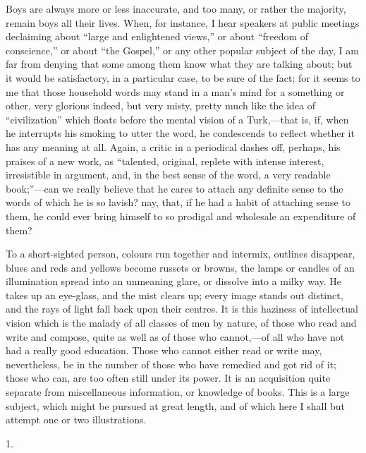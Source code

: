 Boys are always more or less inaccurate, and too many, or rather
the majority, remain boys all their lives. When, for instance, I hear
speakers at public meetings declaiming about ``large and
enlightened views,'' or about ``freedom of conscience,''
or about ``the Gospel,'' or any other popular subject of the
day, I am far from denying that some among them know what they are
talking about; but it would be satisfactory, in a particular case, to
be sure of the fact; for it seems to me that those household words may
stand in a man's mind for a something or other, very glorious indeed,
but very misty, pretty much like the idea of ``civilization''
which floats before the mental vision of a Turk,—that is, if,
when he interrupts his smoking to utter the word, he condescends to
reflect whether it has any meaning at all. Again, a critic in a
periodical dashes off, perhaps, his praises of a new work, as
``talented, original, replete with intense interest, irresistible
in argument, and, in the best sense of the word, a very readable
book;''—can we really believe that he cares to attach any
definite sense to the words of which he is so lavish? nay, that, if he
had a habit of attaching sense to them, he could ever bring himself to
so prodigal and wholesale an expenditure of them?

To a short-sighted person, colours run together and intermix,
outlines disappear, blues and reds and yellows become russets or
browns, the lamps or candles of an illumination spread into an
unmeaning glare, or dissolve into a milky way. He takes up an
eye-glass, and the mist clears up; every image stands out distinct,
and the rays of light fall back upon their centres. It is this
haziness of intellectual vision which is the malady of all classes of
men by nature, of those who read and write and compose, quite as well
as of those who cannot,—of all who have not had a really good
education. Those who cannot either read or write may, nevertheless, be
in the number of those who have remedied and got rid of it; those who
can, are too often still under its power. It is an acquisition quite
separate from miscellaneous information, or knowledge of books. This
is a large subject, which might be pursued at great length, and of
which here I shall but attempt one or two illustrations.


1.

